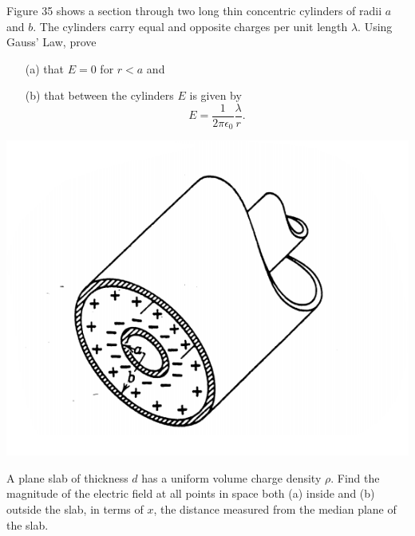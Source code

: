 \documentclass[12pt,letterpaper,boxed,cm]{hmcpset}
\newcommand{\f}[2]{\frac{#1}{#2}}
\begin{document}

\begin{problem}[27-P8]
Figure 35 shows a section through two long thin concentric cylinders of radii $a$ and $b$. The cylinders carry equal and opposite charges per unit length $\lambda$. Using Gauss' Law, prove 
\begin{enumerate}
	\item[(a)] that $E = 0$ for $r < a$ and
	\item[(b)] that between the cylinders $E$ is given by
\[
	E = \f{1}{2\pi\epsilon_0} \f{\lambda}{r}.
\]
\end{enumerate}
\begin{center}
	\includegraphics[scale=0.7]{01.png}
\end{center}
\end{problem}
\begin{solution}
\end{solution}
\newpage

\begin{problem}[27-P16]
A plane slab of thickness $d$ has a uniform volume charge density $\rho$. Find the magnitude of the electric field at all points in space both (a) inside and (b) outside the slab, in terms of $x$, the distance measured from the median plane of the slab.
\end{problem}
\begin{solution}
\end{solution}
\newpage
\end{document}
